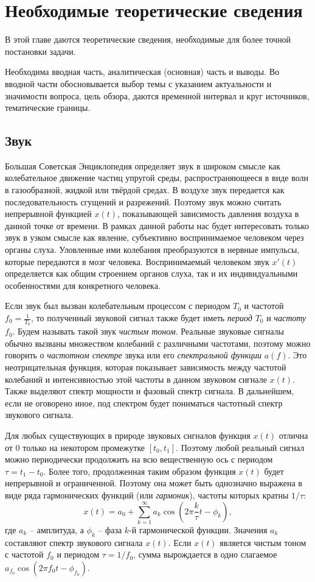 \chapter{Необходимые теоретические сведения} \label{chaptT}

В этой главе даются теоретические сведения, необходимые для более точной
постановки задачи. 

Необходима вводная часть, аналитическая (основная) часть и выводы. Во вводной
части обосновывается выбор темы с указанием актуальности и значимости вопроса,
цель обзора, даются временной интервал и круг источников, тематические границы.

\section{Звук} \label{sectT_sound}

Большая Советская Энциклопедия определяет звук в широком смысле как
колебательное движение частиц упругой среды, распространяющееся в виде волн в
газообразной, жидкой или твёрдой средах. В воздухе звук передается как
последовательность сгущений и разрежений. Поэтому звук можно считать непрерывной
функцией $x(t)$, показывающей зависимость давления воздуха в данной точке от
времени. В рамках данной работы нас будет интересовать только звук в узком
смысле как явление, субъективно воспринимаемое человеком через органы слуха.
Уловленные ими колебания преобразуются в нервные импульсы, которые передаются в
мозг человека. Воспринимаемый человеком звук $x'(t)$ определяется как общим
строением органов слуха, так и их индивидуальными особенностями для конкретного
человека.

Если звук был вызван колебательным процессом с периодом $T_0$ и частотой $f_0 =
\frac{1}{T_0}$, то полученный звуковой сигнал также будет иметь \emph{период}
$T_0$ и \emph{частоту} $f_0$. Будем называть такой звук \emph{чистым тоном}.
Реальные звуковые сигналы обычно вызваны множеством колебаний с различными
частотами, поэтому можно говорить о \emph{частотном спектре} звука или его
\emph{спектральной функции} $a(f)$. Это неотрицательная функция,
которая показывает зависимость между частотой колебаний и интенсивностью этой
частоты в данном звуковом сигнале $x(t)$. Также выделяют спектр мощности и
фазовый спектр сигнала. В дальнейшем, если не оговорено иное, под спектром будет
пониматься частотный спектр звукового сигнала.

Для любых существующих в природе звуковых сигналов функция $x(t)$ отлична от 0
только на некотором промежутке $[t_0, t_1]$. Поэтому любой реальный сигнал можно
периодически продолжить на всю вещественную ось с периодом $\tau = t_1 - t_0$.
Более того, продолженная таким образом функция $x(t)$ будет непрерывной и
ограниченной. Поэтому она может быть однозначно выражена в виде ряда
гармонических функций (или \emph{гармоник}), частоты которых кратны $1 / \tau$:
$$x(t) = a_0 + \sum_{k=1}^\infty a_k \cos(2\pi \frac{k}{\tau} t - \phi_k),$$ где
$a_k$ -- амплитуда, а $\phi_k$ -- фаза $k$-й гармонической функции. Значения
$a_k$ составляют спектр звукового сигнала $x(t)$. Если $x(t)$ является чистым
тоном с частотой $f_0$ и периодом $\tau = 1/f_0$, сумма вырождается в одно
слагаемое $a_{f_0} \cos(2 \pi f_0 t - \phi_{f_0})$.

